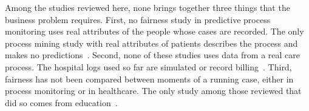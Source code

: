 Among the studies reviewed here, none brings together three things that the business problem requires. First, no fairness study in predictive process monitoring uses real attributes of the people whose cases are recorded. The only process mining study with real attributes of patients describes the process and makes no predictions~\cite{andreswari2026fairness}. Second, none of these studies uses data from a real care process. The hospital logs used so far are simulated or record billing~\cite{deleoni2025achieving,kappel2026human,mohrlein2025fairloop,desantis2027fairness}. Third, fairness has not been compared between moments of a running case, either in process monitoring or in healthcare. The only study among those reviewed that did so comes from education~\cite{rzepka2022fairness}.
